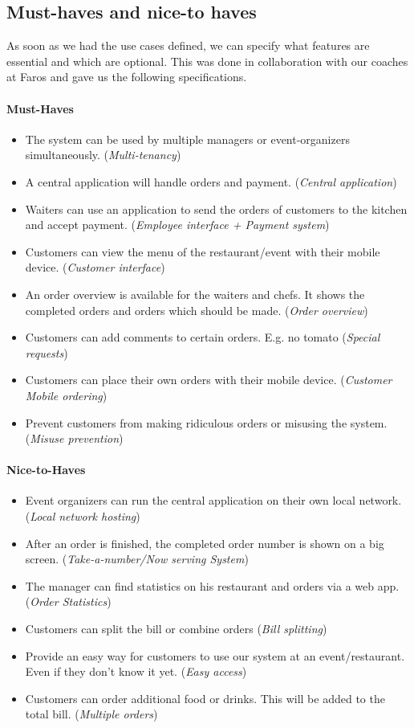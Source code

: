 \documentclass[12pt]{article}
\begin{document}
\begin{multicols}{2}
\label{sec:musthaves}
\subsection{Must-haves and nice-to haves}
As soon as we had the use cases defined, we can specify what features are essential and which are optional. This was done in collaboration with our coaches at Faros and gave us the following specifications.
\paragraph{Must-Haves}
\begin{itemize}
	\raggedright
	\item The system can be used by multiple managers or event-organizers simultaneously. 
	(\textit{Multi-tenancy})
	\item A central application will handle orders and payment. 
	(\textit{Central application})
	\item Waiters can use an application to send the orders of customers to the kitchen and accept payment. 
	(\textit{Employee interface + Payment system})
	\item Customers can view the menu of the restaurant/event with their mobile device. 
	(\textit{Customer interface})
	\item An order overview is available for the waiters and chefs. It shows the completed orders and orders which should be made. 
	(\textit{Order overview})
	\item Customers can add comments to certain orders. E.g. no tomato
	(\textit{Special requests}) 
	\item Customers can place their own orders with their mobile device. 
	(\textit{Customer Mobile ordering})
	\item Prevent customers from making ridiculous orders or misusing the system.
	(\textit{Misuse prevention})
\end{itemize}
\paragraph{Nice-to-Haves}
\begin{itemize}
	\raggedright
	\item Event organizers can run the central application on their own local network. 
	(\textit{Local network hosting})
	\item After an order is finished, the completed order number is shown on a big screen. 
	(\textit{Take-a-number/Now serving System})
	\item The manager can find statistics on his restaurant and orders via a web app. 
	(\textit{Order Statistics})
	\item Customers can split the bill or combine orders 
	(\textit{Bill splitting})
	\item Provide an easy way for customers to use our system at an event/restaurant. Even if they don’t know it yet. 
	(\textit{Easy access})
	\item Customers can order additional food or drinks. This will be added to the total bill.
	(\textit{Multiple orders})
\end{itemize}


\end{multicols}
\end{document}
